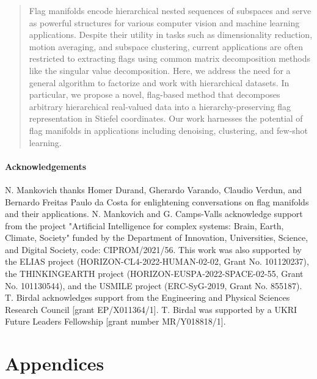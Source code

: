\documentclass[10pt,twocolumn,letterpaper]{article}
\begin{document}
\maketitle

\begin{abstract}
Flag manifolds encode hierarchical nested sequences of subspaces and serve as powerful structures for various computer vision and machine learning applications. Despite their utility in tasks such as dimensionality reduction, motion averaging, and subspace clustering, current applications are often restricted to extracting flags using common matrix decomposition methods like the singular value decomposition. Here, we address the need for a general algorithm to factorize and work with hierarchical datasets. In particular, we propose a novel, flag-based method that decomposes arbitrary hierarchical real-valued data into a hierarchy-preserving flag representation in Stiefel coordinates. Our work harnesses the potential of flag manifolds in applications including denoising, clustering, and few-shot learning.%
\end{abstract}

% 


\vspace{-1mm}
% 






\paragraph{Acknowledgements}
N. Mankovich thanks Homer Durand, Gherardo Varando, Claudio Verdun, and Bernardo Freitas Paulo da Costa for enlightening conversations on flag manifolds and their applications.
N. Mankovich and G. Camps-Valls acknowledge support from the project "Artificial Intelligence for complex systems: Brain, Earth, Climate, Society" funded by the Department of Innovation, Universities, Science, and Digital Society, code: CIPROM/2021/56. This work was also supported by the ELIAS project (HORIZON-CL4-2022-HUMAN-02-02, Grant No. 101120237), the THINKINGEARTH project (HORIZON-EUSPA-2022-SPACE-02-55, Grant No. 101130544), and the USMILE project (ERC-SyG-2019, Grant No. 855187).
T. Birdal acknowledges support from the Engineering and Physical Sciences Research Council [grant EP/X011364/1].
T. Birdal was supported by a UKRI Future Leaders Fellowship [grant number MR/Y018818/1]. 

{\small
 
 
%
}

\newpage
\clearpage
\vspace{2mm}
\appendix
\section*{Appendices}

\end{document}

